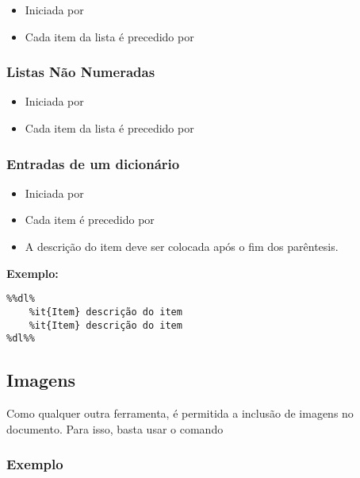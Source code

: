 \documentclass[11pt,a4paper]{article}
\begin{document}
\begin{itemize}
    \item Iniciada por \verb@ %%ol% @ e finalizada por \verb@ %ol%% @;
    \item Cada item da lista é precedido por \verb@ %it @;
\end{itemize}


\subsubsection{Listas Não Numeradas}

\begin{itemize}
    \item Iniciada por \verb@ %%ul% @ e finalizada por \verb@ %ul%% @;
    \item Cada item da lista é precedido por \verb@ %it @;
\end{itemize}


\subsubsection{Entradas de um dicionário}

\begin{itemize}
    \item Iniciada por \verb@ %%dl% @ e finalizada por \verb@ %dl%% @;
    \item Cada item é precedido por \verb@ %it{} @ e o texto que ficará a negrito deverá ser colocado entre os parêntesis;
    \item A descrição do item deve ser colocada após o fim dos parêntesis.
\end{itemize}

\textbf{Exemplo:}

\begin{verbatim}
%%dl%
    %it{Item} descrição do item
    %it{Item} descrição do item
%dl%%
\end{verbatim} 


\subsection{Imagens}
Como qualquer outra ferramenta, é permitida a inclusão de imagens no documento. Para isso, basta usar o comando \verb@ %img{path,caption} @, sendo "path" o caminho para a respectiva imagem e "caption" a legenda da mesma.

\subsubsection{Exemplo}
\verb@ %img{exemplo.png, Legenda da imagem} @
\end{document}
